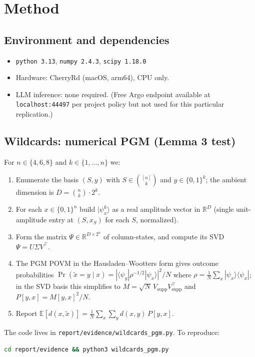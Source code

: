 \documentclass[11pt]{article}
\begin{document}
\section{Method}

\subsection{Environment and dependencies}
\begin{itemize}
  \item \texttt{python 3.13}, \texttt{numpy 2.4.3}, \texttt{scipy 1.18.0}
  \item Hardware: CherryRd (macOS, arm64), CPU only.
  \item LLM inference: none required. (Free Argo endpoint available at
  \texttt{localhost:44497} per project policy but not used for this
  particular replication.)
\end{itemize}

\subsection{Wildcards: numerical PGM (Lemma 3 test)}

For $n\in\{4,6,8\}$ and $k\in\{1,\ldots,n\}$ we:
\begin{enumerate}
  \item Enumerate the basis $(S,y)$ with $S\in\binom{[n]}{k}$ and
  $y\in\{0,1\}^k$; the ambient dimension is $D=\binom{n}{k}\cdot 2^k$.
  \item For each $x\in\{0,1\}^n$ build $|\psi_x^k\rangle$ as a real
  amplitude vector in $\mathbb{R}^D$ (single unit-amplitude entry at
  $(S,x_S)$ for each $S$, normalized).
  \item Form the matrix $\Psi\in\mathbb{R}^{D\times 2^n}$ of column-states,
  and compute its SVD $\Psi=U\Sigma V^\top$.
  \item The PGM POVM in the Hausladen--Wootters form gives outcome
  probabilities $\Pr(\tilde x = y\mid x) = |\langle\psi_y|\rho^{-1/2}
  |\psi_x\rangle|^2/N$ where $\rho=\tfrac1N\sum_x
  |\psi_x\rangle\langle\psi_x|$; in the SVD basis this simplifies to
  $M = \sqrt N\, V_{\text{supp}}V_{\text{supp}}^\top$ and
  $P[y,x] = M[y,x]^2/N$.
  \item Report $\mathbb{E}[d(x,\tilde x)] = \frac1N\sum_x\sum_y
  d(x,y)\,P[y,x]$.
\end{enumerate}
The code lives in \texttt{report/evidence/wildcards\_pgm.py}. To reproduce:
\begin{lstlisting}[language=bash]
cd report/evidence && python3 wildcards_pgm.py
\end{lstlisting}
\end{document}
